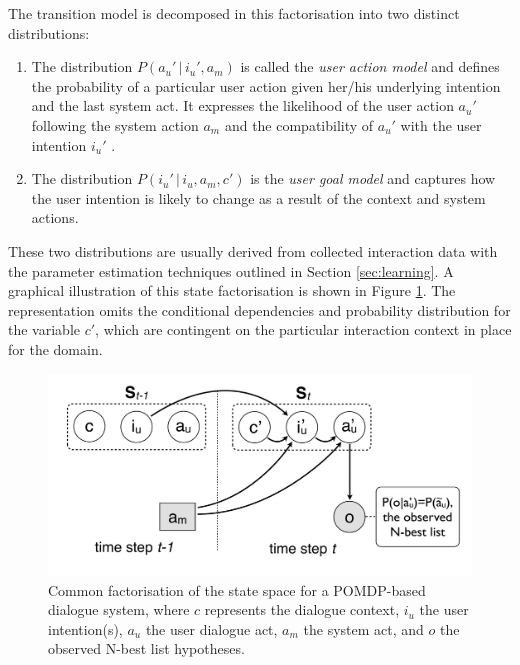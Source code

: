The transition model is decomposed in this factorisation into two distinct distributions: \begin{enumerate}
\item  The distribution $P(a_u' \, | \, i_u', a_m)$ is called the \textit{user action model} and defines the probability of a particular user action given her/his underlying intention and the last system act.  It expresses the likelihood of the user action $a_u'$ following the system action $a_m$ and the compatibility of $a_u'$ with the user intention $i_u'$ \citep{Young:2010}.
\item The distribution $P(i_u' \, | \, i_u, a_m, c')$ is the \textit{user goal model} and captures how the user intention is likely to change as a result of the context and system actions.  
\end{enumerate}

These two distributions are usually derived from collected interaction data with the parameter estimation techniques outlined in Section \ref{sec:learning}. A graphical illustration of this state factorisation is shown in Figure \ref{fig:pomdp2}. The representation omits the conditional dependencies and probability distribution for the variable $c'$, which are contingent on the particular interaction context in place for the domain.

\begin{figure}[h]
\centering
\includegraphics[scale=0.25]{imgs/POMDP2.pdf}
\caption{Common factorisation of the state space for a POMDP-based dialogue system, where $c$ represents the dialogue context, $i_u$ the user intention(s), $a_u$ the user dialogue act, $a_m$ the system act, and $o$ the observed N-best list hypotheses.}
\label{fig:pomdp2}
\end{figure}


